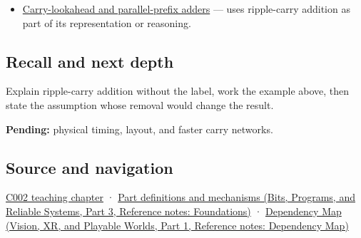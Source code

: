 \hypertarget{appendix-17917d9fdbe3-used-by}{}

\begin{itemize}
\tightlist
\item
  \hyperref[appendix-b5c46b2d94ff]{Carry-lookahead and parallel-prefix adders} --- uses ripple-carry addition as part of its representation or reasoning.
\end{itemize}

\subsection{Recall and next depth}\label{appendix-17917d9fdbe3-recall-and-next-depth}

\hypertarget{appendix-17917d9fdbe3-recall-and-next-depth}{}

Explain ripple-carry addition without the label, work the example above, then state the assumption whose removal would change the result.

\textbf{Pending:} physical timing, layout, and faster carry networks.

\subsection{Source and navigation}\label{appendix-17917d9fdbe3-source-and-navigation}

\hypertarget{appendix-17917d9fdbe3-source-and-navigation}{}

\hyperref[01-foundations-i-ch001-arithmetic-becomes-a-policy]{C002 teaching chapter} · \href{../01-Bits-Programs-and-Reliable-Systems-P03/main.pdf\#appendix-fd090d982a15}{Part definitions and mechanisms (Bits, Programs, and Reliable Systems, Part 3, Reference notes: Foundations)} · \href{../07-Vision-XR-and-Playable-Worlds-P01/main.pdf\#appendix-4ad47bdd269a}{Dependency Map (Vision, XR, and Playable Worlds, Part 1, Reference notes: Dependency Map)}
